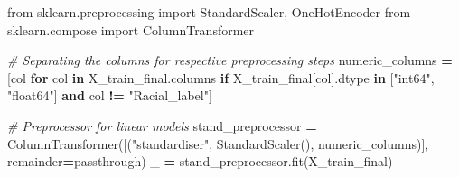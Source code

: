 \documentclass[a4paper, oneside]{report}
\newenvironment{Shaded}{\begin{snugshade}}{\end{snugshade}}
\newcommand{\CommentTok}[1]{\textcolor[rgb]{0.56,0.35,0.01}{\textit{#1}}}
\newcommand{\ControlFlowTok}[1]{\textcolor[rgb]{0.13,0.29,0.53}{\textbf{#1}}}
\newcommand{\ImportTok}[1]{#1}
\newcommand{\KeywordTok}[1]{\textcolor[rgb]{0.13,0.29,0.53}{\textbf{#1}}}
\newcommand{\NormalTok}[1]{#1}
\newcommand{\OperatorTok}[1]{\textcolor[rgb]{0.81,0.36,0.00}{\textbf{#1}}}
\newcommand{\StringTok}[1]{\textcolor[rgb]{0.31,0.60,0.02}{#1}}
\renewenvironment{Shaded}
{
  \vspace{4pt}%
  \begin{snugshade}%
}{%
  \end{snugshade}%
  \vspace{4pt}%
}
\begin{document}
\begin{Shaded}
\begin{Highlighting}[]
\ImportTok{from}\NormalTok{ sklearn.preprocessing }\ImportTok{import}\NormalTok{ StandardScaler, OneHotEncoder}
\ImportTok{from}\NormalTok{ sklearn.compose }\ImportTok{import}\NormalTok{ ColumnTransformer}

\CommentTok{\# Separating the columns for respective preprocessing steps}
\NormalTok{numeric\_columns }\OperatorTok{=}\NormalTok{ [col }\ControlFlowTok{for}\NormalTok{ col }\KeywordTok{in}\NormalTok{ X\_train\_final.columns }\ControlFlowTok{if}\NormalTok{ X\_train\_final[col].dtype }\KeywordTok{in}\NormalTok{ [}\StringTok{"int64"}\NormalTok{, }\StringTok{"float64"}\NormalTok{] }\KeywordTok{and}\NormalTok{ col }\OperatorTok{!=} \StringTok{"Racial\_label"}\NormalTok{]}

\CommentTok{\# Preprocessor for linear models}
\NormalTok{stand\_preprocessor }\OperatorTok{=}\NormalTok{ ColumnTransformer([(}\StringTok{"standardiser"}\NormalTok{, StandardScaler(), numeric\_columns)],}
\NormalTok{                                         remainder}\OperatorTok{=}\StringTok{\textquotesingle{}passthrough\textquotesingle{}}\NormalTok{)}
\NormalTok{\_ }\OperatorTok{=}\NormalTok{ stand\_preprocessor.fit(X\_train\_final)}
\end{Highlighting}
\end{Shaded}
\end{document}
